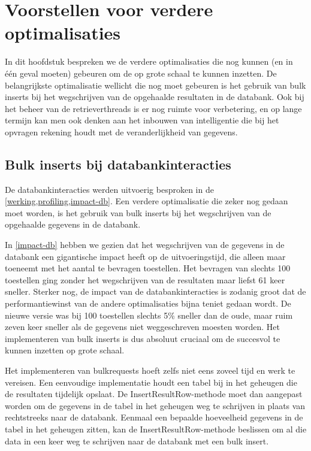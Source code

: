 \chapter{Voorstellen voor verdere optimalisaties}

In dit hoofdstuk bespreken we de verdere optimalisaties die nog kunnen (en in één geval moeten) gebeuren om de \nwmretriever{} op grote schaal te kunnen inzetten.
De belangrijkste optimalisatie wellicht die nog moet gebeuren is het gebruik van bulk inserts bij het wegschrijven van de opgehaalde resultaten in de databank.
Ook bij het beheer van de retrieverthreads is er nog ruimte voor verbetering,
en op lange termijn kan men ook denken aan het inbouwen van intelligentie die bij het opvragen rekening houdt met de veranderlijkheid van gegevens.


\section{Bulk inserts bij databankinteracties}

De databankinteracties werden uitvoerig besproken in de \cref{werking,profiling,impact-db}.
Een verdere optimalisatie die zeker nog gedaan moet worden,
is het gebruik van bulk inserts bij het wegschrijven van de opgehaalde gegevens in de databank.

In \cref{impact-db} hebben we gezien dat het wegschrijven van de gegevens in de databank een gigantische impact heeft op de uitvoeringstijd,
die alleen maar toeneemt met het aantal te bevragen toestellen.
Het bevragen van slechts 100 toestellen ging zonder het wegschrijven van de resultaten maar liefst 61 keer sneller.
Sterker nog, de impact van de databankinteracties is zodanig groot dat de performantiewinst van de andere optimalisaties bijna teniet gedaan wordt.
De nieuwe versie was bij 100 toestellen slechts 5\% sneller dan de oude, maar ruim zeven keer sneller als de gegevens niet weggeschreven moesten worden.
Het implementeren van bulk inserts is dus absoluut cruciaal om de \nwmretriever{} succesvol te kunnen inzetten op grote schaal.

Het implementeren van bulkrequests hoeft zelfs niet eens zoveel tijd en werk te vereisen.{}
Een eenvoudige implementatie houdt een tabel bij in het geheugen die de resultaten tijdelijk opslaat.
De InsertResultRow-methode moet dan aangepast worden om de gegevens in de tabel in het geheugen weg te schrijven in plaats van rechtstreeks naar de databank.
Eenmaal een bepaalde hoeveelheid gegevens in de tabel in het geheugen zitten, kan de InsertResultRow-methode beslissen om al die data
in een keer weg te schrijven naar de databank met een bulk insert.

